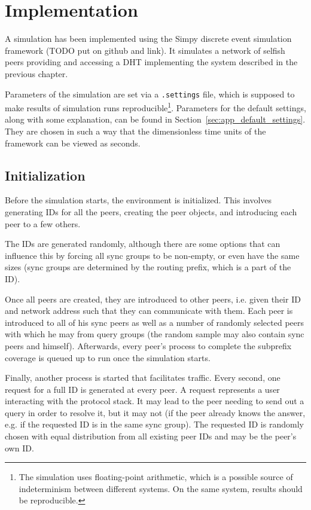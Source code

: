 \chapter{Implementation}
\label{chap:implementation}
A simulation has been implemented using the Simpy discrete event simulation
framework (TODO put on github and link). It simulates a network of selfish peers
providing and accessing a \ac{DHT} implementing the system described in the
previous chapter.

Parameters of the simulation are set via a \texttt{.settings} file, which is
supposed to make results of simulation runs reproducible\footnote{The simulation
uses floating-point arithmetic, which is a possible source of indeterminism
between different systems\cite{dawson2013determinism}. On the same system,
results should be reproducible.}. Parameters for the default settings, along
with some explanation, can be found in Section~\ref{sec:app_default_settings}.
They are chosen in such a way that the dimensionless time units of the
framework can be viewed as seconds.

\section{Initialization}
Before the simulation starts, the environment is initialized. This involves
generating IDs for all the peers, creating the peer objects, and introducing
each peer to a few others.

The IDs are generated randomly, although there are some options that can
influence this by forcing all sync groups to be non-empty, or even have the same
sizes (sync groups are determined by the routing prefix, which is a part of the
ID).

Once all peers are created, they are introduced to other peers, i.e. given their
ID and network address such that they can communicate with them. Each peer is
introduced to all of his sync peers as well as a number of randomly selected
peers with which he may from query groups (the random sample may also contain
sync peers and himself). Afterwards, every peer's process to complete the
subprefix coverage is queued up to run once the simulation starts.

Finally, another process is started that facilitates traffic. Every second, one
request for a full ID is generated at every peer. A request represents a user
interacting with the protocol stack. It may lead to the peer needing to send out
a query in order to resolve it, but it may not (if the peer already knows the
answer, e.g. if the requested ID is in the same sync group). The requested ID is
randomly chosen with equal distribution from all existing peer IDs and may be
the peer's own ID.

